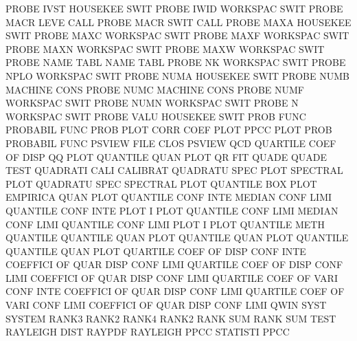 PROBE    IVST                           HOUSEKEE SWIT
PROBE    IWID                           WORKSPAC SWIT
PROBE    MACR LEVE                      CALL
PROBE    MACR SWIT                      CALL
PROBE    MAXA                           HOUSEKEE SWIT
PROBE    MAXC                           WORKSPAC SWIT
PROBE    MAXF                           WORKSPAC SWIT
PROBE    MAXN                           WORKSPAC SWIT
PROBE    MAXW                           WORKSPAC SWIT
PROBE    NAME TABL                      NAME     TABL
PROBE    NK                             WORKSPAC SWIT
PROBE    NPLO                           WORKSPAC SWIT
PROBE    NUMA                           HOUSEKEE SWIT
PROBE    NUMB                           MACHINE  CONS
PROBE    NUMC                           MACHINE  CONS
PROBE    NUMF                           WORKSPAC SWIT
PROBE    NUMN                           WORKSPAC SWIT
PROBE    N                              WORKSPAC SWIT
PROBE    VALU                           HOUSEKEE SWIT
PROB     FUNC                           PROBABIL FUNC
PROB     PLOT CORR COEF PLOT            PPCC     PLOT
PROB                                    PROBABIL FUNC
PSVIEW   FILE CLOS                      PSVIEW
QCD                                     QUARTILE COEF OF   DISP
QQ       PLOT                           QUANTILE QUAN PLOT
QR                                      FIT
QUADE                                   QUADE    TEST
QUADRATI CALI                           CALIBRAT
QUADRATU SPEC PLOT                      SPECTRAL PLOT
QUADRATU SPEC                           SPECTRAL PLOT
QUANTILE BOX  PLOT                      EMPIRICA QUAN PLOT
QUANTILE CONF INTE                      MEDIAN   CONF LIMI
QUANTILE CONF INTE PLOT                 I        PLOT
QUANTILE CONF LIMI                      MEDIAN   CONF LIMI
QUANTILE CONF LIMI PLOT                 I        PLOT
QUANTILE METH                           QUANTILE
QUANTILE QUAN PLOT                      QUANTILE QUAN PLOT
QUANTILE                                QUANTILE QUAN PLOT
QUARTILE COEF OF   DISP CONF INTE       COEFFICI OF   QUAR DISP CONF LIMI
QUARTILE COEF OF   DISP CONF LIMI       COEFFICI OF   QUAR DISP CONF LIMI
QUARTILE COEF OF   VARI CONF INTE       COEFFICI OF   QUAR DISP CONF LIMI
QUARTILE COEF OF   VARI CONF LIMI       COEFFICI OF   QUAR DISP CONF LIMI
QWIN     SYST                           SYSTEM
RANK3                                   RANK2
RANK4                                   RANK2
RANK     SUM                            RANK     SUM  TEST
RAYLEIGH DIST                           RAYPDF
RAYLEIGH PPCC                           STATISTI PPCC
